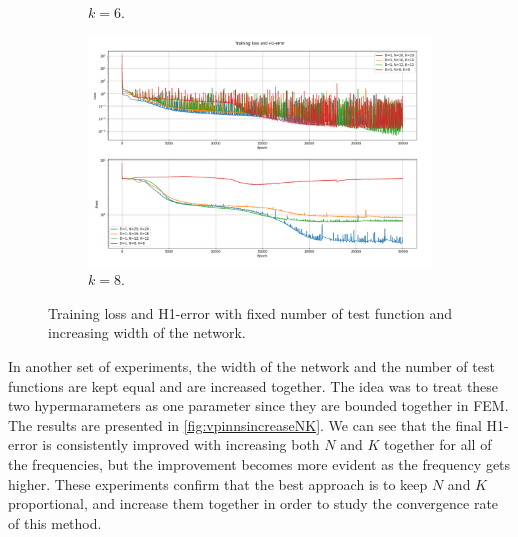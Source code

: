\begin{figure}[h!]
\begin{subfigure}[b]{0.48\textwidth}
        \caption{$k=6$.}
        \label{fig:vpinnsk6increaseNK}
    \end{subfigure}
    \hfill
    \begin{subfigure}[b]{0.48\textwidth}
        \includegraphics[width=\textwidth]{img/VPINN-Comparison-k8increaseNK.png}
        \caption{$k=8$.}
        \label{fig:vpinnsk8increaseNK}
    \end{subfigure}
    \caption{Training loss and H1-error with fixed number of test function and increasing width of the network.}
    \label{fig:vpinnsincreaseNK}
\end{figure}

In another set of experiments, the width of the network and the number of test functions are kept equal and are increased together. The idea was to treat these two hypermarameters as one parameter since they are bounded together in FEM. The results are presented in \autoref{fig:vpinnsincreaseNK}. We can see that the final H1-error is consistently improved with increasing both $N$ and $K$ together for all of the frequencies, but the improvement becomes more evident as the frequency gets higher. These experiments confirm that the best approach is to keep $N$ and $K$ proportional, and increase them together in order to study the convergence rate of this method.

